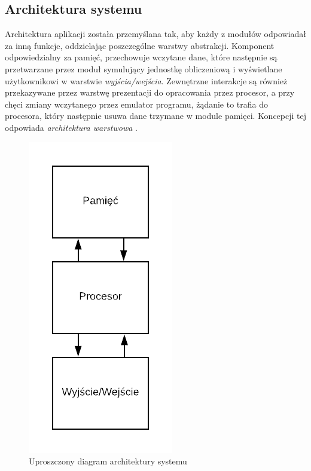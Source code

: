 \subsection{Architektura systemu}
Architektura aplikacji została przemyślana tak, aby każdy z modułów odpowiadał za inną funkcje, oddzielając poszczególne warstwy abstrakcji. Komponent odpowiedzialny za pamięć, przechowuje wczytane dane, które następnie są przetwarzane przez moduł symulujący jednostkę obliczeniową i wyświetlane użytkownikowi w warstwie \textit{wyjścia/wejścia}. Zewnętrzne interakcje są również przekazywane przez warstwę prezentacji do opracowania przez procesor, a przy chęci zmiany wczytanego przez emulator programu, żądanie to trafia do procesora, który następnie usuwa dane trzymane w module pamięci. Koncepcji tej odpowiada \textit{architektura warstwowa} \cite{Richards}.

\begin{figure}[!htb]
\begin{center}
	\includegraphics[scale=0.4]{images/architectureDiag}
	\caption{Uproszczony diagram architektury systemu}
\end{center}
\end{figure}

\newpage

